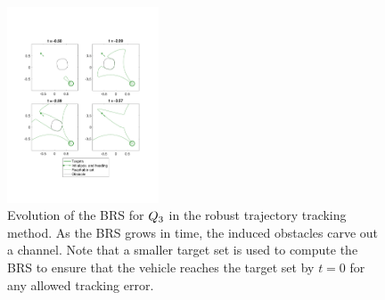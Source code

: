 \begin{figure}[h]
  \centering
  \includegraphics[width=0.40\textwidth]{"fig/rtt_rs3"}
  \caption{Evolution of the BRS for $Q_3$ in the robust trajectory tracking method. As the BRS grows in time, the induced obstacles carve out a channel. Note that a smaller target set is used to compute the BRS to ensure that the vehicle reaches the target set by $t=0$ for any allowed tracking error.}
  \label{fig:rtt_rs3}
  \vspace{-1em}
\end{figure}
\vspace{-0.2em}